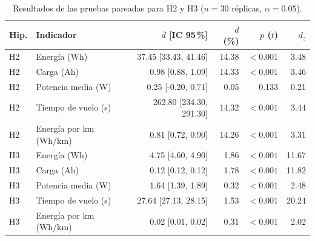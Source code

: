 \begin{table}[H]
\centering
\small
\caption{Resultados de las pruebas pareadas para H2 y H3 ($n=30$ réplicas, $\alpha=0.05$).}
\label{tab:pruebas_estadisticas}
\begin{tabular}{l l r r r r}
\toprule
Hip. & Indicador & $\bar d$ [IC 95\,\%] & $\bar d$ (\%) & $p$ ($t$) & $d_z$ \\
\midrule
H2 & Energía (Wh) & 37.45 [33.43, 41.46] & 14.38 & $<0.001$ & 3.48 \\
H2 & Carga (Ah) & 0.98 [0.88, 1.09] & 14.33 & $<0.001$ & 3.46 \\
H2 & Potencia media (W) & 0.25 [-0.20, 0.71] & 0.05 & 0.133 & 0.21 \\
H2 & Tiempo de vuelo (s) & 262.80 [234.30, 291.30] & 14.32 & $<0.001$ & 3.44 \\
H2 & Energía por km (Wh/km) & 0.81 [0.72, 0.90] & 14.26 & $<0.001$ & 3.31 \\
H3 & Energía (Wh) & 4.75 [4.60, 4.90] & 1.86 & $<0.001$ & 11.67 \\
H3 & Carga (Ah) & 0.12 [0.12, 0.12] & 1.78 & $<0.001$ & 11.82 \\
H3 & Potencia media (W) & 1.64 [1.39, 1.89] & 0.32 & $<0.001$ & 2.48 \\
H3 & Tiempo de vuelo (s) & 27.64 [27.13, 28.15] & 1.53 & $<0.001$ & 20.24 \\
H3 & Energía por km (Wh/km) & 0.02 [0.01, 0.02] & 0.31 & $<0.001$ & 2.02 \\
\bottomrule
\end{tabular}
\end{table}
